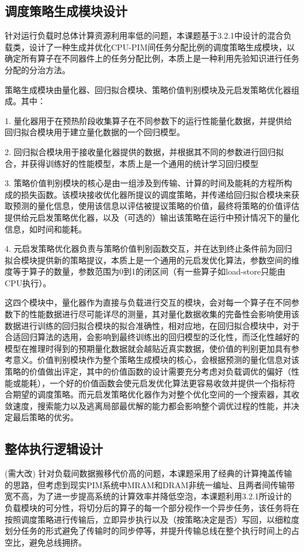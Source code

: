   \subsection{调度策略生成模块设计}\label{subsec:scheduleGen_module_design}
  针对运行负载时总体计算资源利用率低的问题，本课题基于3.2.1中设计的混合负载类，设计了一种生成并优化CPU-PIM间任务分配比例的调度策略生成模块，以确定所有算子在不同器件上的任务分配比例，本质上是一种利用先验知识进行任务分配的分治方法。

  策略生成模块由量化器、回归拟合模块、策略价值判别模块及元启发策略优化器组成。其中：

  1. 量化器用于在预热阶段收集算子在不同参数下的运行性能量化数据，并提供给回归拟合模块用于建立量化数据的一个回归模型。

  2. 回归拟合模块用于接收量化器提供的数据，并根据其不同的参数进行回归拟合，并获得训练好的性能模型，本质上是一个通用的统计学习回归模型 

  3. 策略价值判别模块的核心是由一组涉及到传输、计算的时间及能耗的方程所构成的损失函数。该模块接收优化器所提议的调度策略，并传递给回归拟合模块来获取预测的量化信息，使用该信息以评估被提议策略的价值，最终将策略的价值评估提供给元启发策略优化器，以及（可选的）输出该策略在运行中预计情况下的量化信息，如时间和能耗。

  4. 元启发策略优化器负责与策略价值判别函数交互，并在达到终止条件前为回归拟合模块提供新的策略提议，本质上是一个通用的元启发优化算法，参数空间的维度等于算子的数量，参数范围为0到1的闭区间（有一些算子如load-store只能由CPU执行）。

  这四个模块中，量化器作为直接与负载进行交互的模块，会对每一个算子在不同参数下的性能数据进行尽可能详尽的测量，其对量化数据收集的完备性会影响使用该数据进行训练的回归拟合模块的拟合准确性，相对应地，在回归拟合模块中，对于合适回归算法的选用，会影响到最终训练出的回归模型的泛化性，而泛化性越好的模型在推理时得到的预期量化数据就会越贴近真实数据，使价值的判别更加具有参考意义。价值判别模块作为整个策略生成模块的核心，会根据预测的量化信息对该策略的价值做出评定，其中的价值函数的设计需要充分考虑对负载调优的偏好（性能或能耗），一个好的价值函数会使元启发优化算法更容易收敛并提供一个指标符合期望的调度策略。而元启发策略优化器作为对整个优化空间的一个搜索器，其收敛速度，搜索能力以及逃离局部最优解的能力都会影响整个调优过程的性能，并决定最后策略的优劣。

  \subsection{整体执行逻辑设计}\label{subsec:overall_logic_design}
  (需大改)
  针对负载间数据搬移代价高的问题，本课题采用了经典的计算掩盖传输的思路，但考虑到现实PIM系统中MRAM和DRAM非统一编址、且两者间传输带宽不高，为了进一步提高系统的计算效率并降低空泡，本课题利用3.2.1所设计的负载模块的可分性，将切分后的算子的每一个部分视作一个异步任务，该任务将在按照调度策略进行传输后，立即异步执行以及（按策略决定是否）写回，以细粒度划分任务的形式避免了传输时的同步停等，并提升传输总线在整个执行时间上的占空比，避免总线拥挤。

